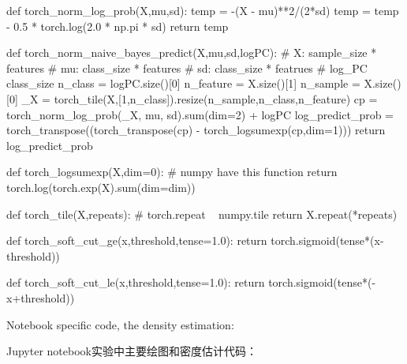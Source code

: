 \documentclass{article}
\begin{document}
\begin{python}
def torch_norm_log_prob(X,mu,sd):    
    temp = -(X - mu)**2/(2*sd) 
    temp = temp - 0.5 * torch.log(2.0 * np.pi * sd)
    return temp

def torch_norm_naive_bayes_predict(X,mu,sd,logPC):
    # X: sample_size * features
    # mu: class_size * features
    # sd: class_size * featrues
    # log_PC class_size
    n_class = logPC.size()[0]
    n_feature = X.size()[1]
    n_sample = X.size()[0]
    _X = torch_tile(X,[1,n_class]).resize(n_sample,n_class,n_feature)
    cp = torch_norm_log_prob(_X, mu, sd).sum(dim=2) + logPC  
    log_predict_prob = torch_transpose((torch_transpose(cp) - torch_logsumexp(cp,dim=1)))
    return log_predict_prob
    
def torch_logsumexp(X,dim=0):
    # numpy have this function
    return torch.log(torch.exp(X).sum(dim=dim))

def torch_tile(X,repeats):
    # torch.repeat ~ numpy.tile
    return X.repeat(*repeats)


def torch_soft_cut_ge(x,threshold,tense=1.0):
    return torch.sigmoid(tense*(x-threshold))

def torch_soft_cut_le(x,threshold,tense=1.0):
    return torch.sigmoid(tense*(-x+threshold))


\end{python}

Notebook specific code, the density estimation:

Jupyter notebook实验中主要绘图和密度估计代码：
\end{document}
